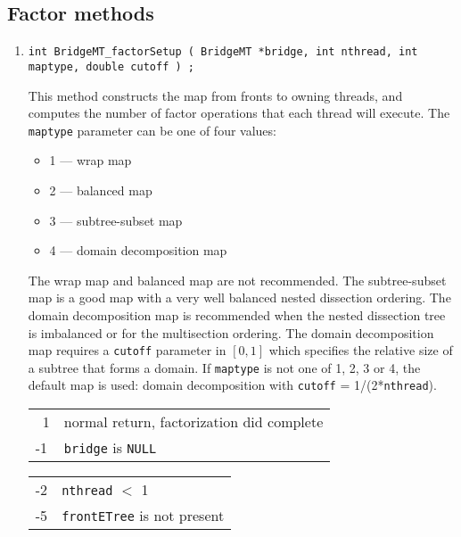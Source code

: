 \subsection{Factor methods}
\label{subsection:BridgeMT:proto:factor}
\par
\begin{enumerate}
\item
\begin{verbatim}
int BridgeMT_factorSetup ( BridgeMT *bridge, int nthread, int maptype, double cutoff ) ;
\end{verbatim}
This method constructs the map from fronts to owning threads, and
computes the number of factor operations that each thread will execute.
The \texttt{maptype} parameter can be one of four values:
\begin{itemize}
\item 1 --- wrap map
\item 2 --- balanced map
\item 3 --- subtree-subset map
\item 4 --- domain decomposition map
\end{itemize}
The wrap map and balanced map are not recommended.
The subtree-subset map is a good map with a very well balanced
nested dissection ordering.
The domain decomposition map is recommended when the nested
dissection tree is imbalanced or for the multisection ordering.
The domain decomposition map requires a \texttt{cutoff} parameter
in $\left \lbrack0,1\right \rbrack$ 
which specifies the relative size of a subtree that forms a domain.
If \texttt{maptype} is not one of 1, 2, 3 or 4, the default map is
used: domain decomposition with
\texttt{cutoff} = 1/(2*\texttt{nthread}).
\par {}
\begin{center}
\begin{tabular}{ll}
~1 & normal return, factorization did complete \\
-1 & \texttt{bridge} is \texttt{NULL} \\
\end{tabular}
\begin{tabular}{ll}
-2 & \texttt{nthread} $<$ 1 \\
-5 & \texttt{frontETree} is not present \\
\end{tabular}

\end{center}
\end{enumerate}
